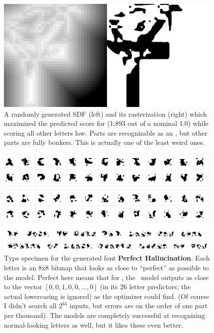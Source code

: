 \documentclass[twocolumn]{article}
\begin{document}
\begin{figure}[tp]
\centering
  \includegraphics[width=0.9 \linewidth]{bonkersf}
\caption{ A randomly generated SDF (left) and its rasterization
  (right) which maximized the predicted score for 
  (1.893 out of a nominal 1.0) while scoring all other letters low.
  Parts are recognizable as an , but other parts are
  fully bonkers. This is actually one of the least weird ones.
} \label{fig:bonkersf}
\end{figure}

\begin{figure}[tp]
\centering
  \includegraphics[width=0.9 \linewidth]{perfecthallucination}
\caption{
   Type specimen for the generated font {\bf Perfect Hallucination}.
   Each letter is an 8x8 bitmap that looks as close to ``perfect''
   as possible to the model. Perfect here means that for ,
   the \makelowercase\ model outputs as close to the vector
   $[0, 0, 1, 0, 0, \ldots, 0]$ (in its 26 letter predictors; the
   actual lowercasing is ignored) as the optimizer could find. (Of
   course I didn't search all $2^{64}$ inputs, but errors are
   on the order of one part per thousand). The models are completely
   successful at recognizing normal-looking letters as well, but
   it likes these even better.
} \label{fig:perfect}
\end{figure}
\end{document}
